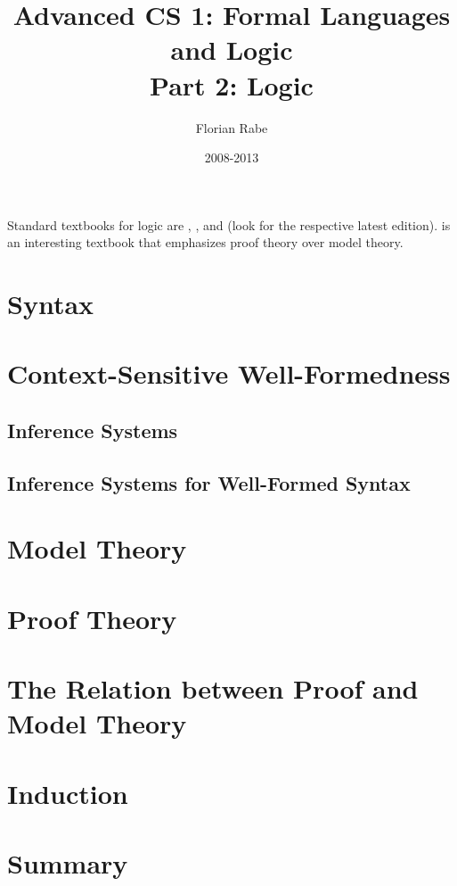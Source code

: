\documentclass{book}
\title{Advanced CS 1: Formal Languages and Logic \\ Part 2: Logic}
\author{Florian Rabe}
\date{2008-2013}
\begin{document}
\maketitle

\tableofcontents

\newpage
Standard textbooks for logic are \cite{fol_gallier}, \cite{fol_smullyan}, and \cite{intrologicenderton} (look for the respective latest edition).
\cite{andrews_truthproof} is an interesting textbook that emphasizes proof theory over model theory.

\chapter{Syntax}\label{sec:syn}
  
  
\chapter{Context-Sensitive Well-Formedness}\label{sec:infsys}
  \section{Inference Systems}
     
  \section{Inference Systems for Well-Formed Syntax}
     


\chapter{Model Theory}\label{sec:mt}
  

\chapter{Proof Theory}\label{sec:pt}
  

\chapter{The Relation between Proof and Model Theory}
  

\chapter{Induction}
  

\chapter{Summary}
  



\end{document}
